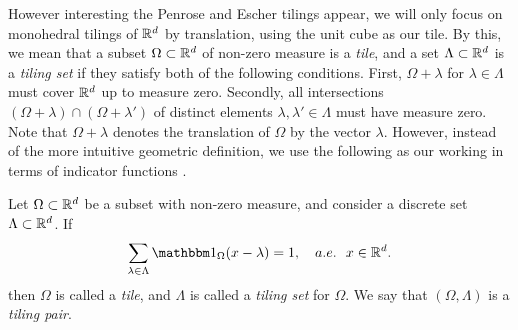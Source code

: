 \documentclass[../thesis.tex]{subfiles}
\begin{document}
However interesting the Penrose and Escher tilings appear, we will only focus on monohedral tilings of $\mathbb{R}^d$ by translation, using the unit cube as our tile. 
 By this, we mean that a subset $\Omega \subset \mathbb{R}^d$ of non-zero measure is a \emph{tile}, and a set $\Lambda \subset \mathbb{R}^d$ is a \emph{tiling set} if they satisfy both of the following conditions. First, $\Omega+\lambda$ for $\lambda \in \Lambda$ must cover $\mathbb{R}^d$ up to measure zero. Secondly, all intersections $(\Omega+\lambda) \cap (\Omega+\lambda')$ of distinct elements $\lambda,\lambda' \in \Lambda$ must have measure zero. Note that $\Omega+\lambda$ denotes the translation of $\Omega$ by the vector $\lambda$.  However, instead of the more intuitive geometric definition, we use the following as our working  in terms of indicator functions \cite{kolountzakisTilingsTranslation2010,kolountzakisStructureTilingsLine1996}.  %
\begin{definition}\label{def:tiling}
    Let $\Omega \subset \mathbb{R}^d$ be a subset with non-zero measure, and consider a discrete set $\Lambda \subset \mathbb{R}^d$. If
    \begin{equation}\label{eq:tiling_set}
        \sum_{\lambda \in \Lambda} \indicator{\Omega}{x-\lambda} = 1, \quad a.e. \text{\space\space} x \in \R^d.
    \end{equation}
    then $\Omega$ is called a \emph{tile}, and $\Lambda$ is called a \emph{tiling set} for $\Omega$. We say that $(\Omega, \Lambda)$ is a \emph{tiling pair}.
\end{definition}
\end{document}
